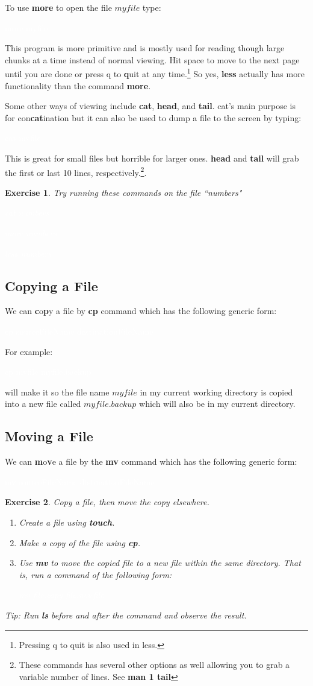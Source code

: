 \documentclass[oneside]{book}
\newcommand{\commandline}[1]{\begin{center} \colorbox{Dark}{\textcolor{white}{#1}} \end{center}}
\newtheorem{ex}{Exercise}[chapter]
\begin{document}
To use \textbf{more} to open the file $myfile$ type:
\commandline{more myfile}
This program is more primitive and is mostly used for reading though large chunks at a time instead of normal viewing. Hit space to move to the next page until you are done or press q to \textbf{q}uit at any time.\footnote{Pressing q to quit is also used in less.} So yes,  \textbf{less} actually has more functionality than the command \textbf{more}.

Some other ways of viewing include \textbf{cat}, \textbf{head}, and \textbf{tail}. cat's main purpose is for con\textbf{cat}ination but it can also be used to dump a file to the screen by typing:
\commandline{cat myfile}
This is great for small files but horrible for larger ones. \textbf{head} and \textbf{tail} will grab the first or last 10 lines, respectively.\footnote{These commands has several other options as well allowing you to grab a variable number of lines. See \textbf{man 1 tail}}.\\

\begin{ex} Try running these commands on the file ``numbers"
\commandline{cat numbers}
\commandline{more numbers}
\commandline{less numbers}

\end{ex}

\subsection{Copying a File}
We can \textbf{c}o\textbf{p}y a file by \textbf{cp} command which has the following generic form:
\commandline{cp sourceFileName destinationFileName}
For example:
\commandline{cp myfile myfile.backup}
will make it so the file name $myfile$ in my current working directory is copied into a new file called $myfile.backup$ which will also be in my current directory.

\subsection{Moving a File}
We can \textbf{m}o\textbf{v}e a file by the \textbf{mv} command which has the following generic form:
\commandline{mv sourceFileName distinationFileName}

\begin{ex} Copy a file, then move the copy elsewhere.
    \begin{enumerate}
        \item Create a file using \textbf{touch}.
        \item Make a copy of the file using \textbf{cp}.
        \item Use \textbf{mv} to move the copied file to a new file within the same directory. That is, run a command of the following form:
        \commandline{mv file.copy file.newfile}
    \end{enumerate}
Tip: Run \textbf{ls} before and after the command and observe the result.
\end{ex}
\end{document}

